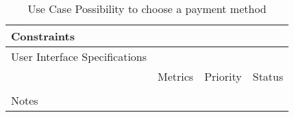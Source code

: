 \begin{table}[H]
\begin{tabularx}{\linewidth}{|l|X|X|X|}
    \hline Constraints                   & \multicolumn{3}{l|}{}                                                                                 \\

    \hline User Interface Specifications & \multicolumn{3}{l|}{}                                                                                 \\

    \hline \multirow{2}{*}{}             & Metrics                                                                           & Priority & Status \\
    \cline{2-4}                          &                                                                                   &          &        \\
    \hline Notes                         & \multicolumn{3}{l|}{}                                                                                 \\
    \hline
  \end{tabularx}
  \caption{Use Case Possibility to choose a payment method}
  \label{tab:use_case_Possibility to choose a payment method}
\end{table}


